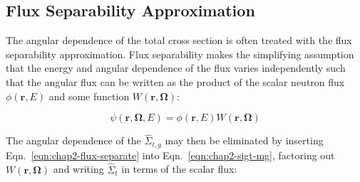 




\subsection{Flux Separability Approximation}
\label{subsec:chap2-angle}

The angular dependence of the total cross section is often treated with the flux separability approximation. Flux separability makes the simplifying assumption that the energy and angular dependence of the flux varies independently such that the angular flux can be written as the product of the scalar neutron flux $\phi(\mathbf{r},E)$ and some function $W(\mathbf{r}, \mathbf{\Omega})$:

\begin{dmath}
\label{eqn:chap2-flux-separate}
\psi(\mathbf{r},\mathbf{\Omega},E) = \phi(\mathbf{r},E) W(\mathbf{r},\mathbf{\Omega})
\end{dmath}

\noindent The angular dependence of the $\hat{\Sigma}_{t,g}$ may then be eliminated by inserting Eqn.~\ref{eqn:chap2-flux-separate} into Eqn.~\ref{eqn:chap2-sigt-mg}, factoring out $W(\mathbf{r},\mathbf{\Omega})$ and writing $\hat{\Sigma}_{t}$ in terms of the scalar flux:

